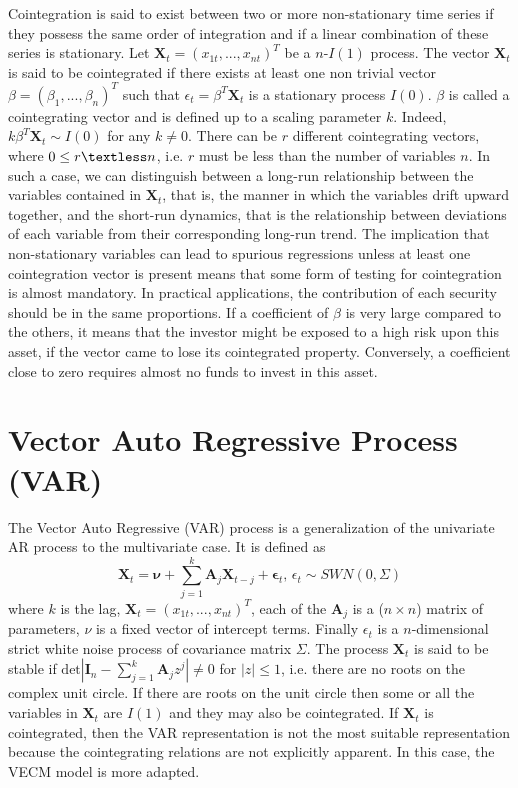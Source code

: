 \documentclass[11pt,a4,twosided,singlespacing,titlepagenumber=on]{scrreprt}
\numberwithin{equation}{chapter} %
\theoremstyle{remark}
\newcommand{\matr}[1]{\mathbf{#1}}
\begin{document}
Cointegration is said to exist between two or more non-stationary time series if they possess the same order of integration and if a linear combination of these series is stationary. Let $\matr{X}_t = (x_{1t},...,x_{nt})^T$ be a $n$-$I(1)$ process. The vector $\matr{X}_t$ is said to be cointegrated if there exists at least one non trivial vector $\beta = (\beta_1,...,\beta_n)^T$ such that $\epsilon_t = \beta^T \matr{X}_t$ is a stationary process $I(0)$. $\beta$ is called a cointegrating vector and is defined up to a scaling parameter $k$. Indeed, $k\beta^T\matr{X}_t \sim I(0)$ for any $k \neq 0$. There can be $r$ different cointegrating vectors, where $0 \leq r \textless n$, i.e. $r$ must be less than the number of variables $n$. In such a case, we can distinguish between a long-run relationship between the variables contained in $\matr{X}_t$, that is, the manner in which the variables drift upward together, and the short-run dynamics, that is the relationship between deviations of each variable from their corresponding long-run trend. The implication that non-stationary variables can lead to spurious regressions unless at least one cointegration vector is present means that some form of testing for cointegration is almost mandatory. In practical applications, the contribution of each security should be in the same proportions. If a coefficient of $\beta$ is very large compared to the others, it means that the investor might be exposed to a high risk upon this asset, if the vector came to lose its cointegrated property. Conversely, a coefficient close to zero requires almost no funds to invest in this asset.

\section{Vector Auto Regressive Process (VAR)}
The Vector Auto Regressive (VAR) process is a generalization of the univariate AR process to the multivariate case. It is defined as
\begin{equation}
\matr{X}_t = \matr{\nu} + \sum_{j=1}^k \matr{A}_j \matr{X}_{t-j} + \matr{\epsilon}_t \text{, } \epsilon_t \sim SWN(0, \Sigma)
\end{equation}
where $k$ is the lag, $\matr{X}_t = (x_{1t},...,x_{nt})^T$, each of the $\matr{A}_j$ is a ($n \times n$) matrix of parameters, $\nu$ is a fixed vector of intercept terms. Finally $\epsilon_t$ is a $n$-dimensional strict white noise process of covariance matrix $\Sigma$. The process $\matr{X}_t$ is said to be stable if $\text{det}|\matr{I}_n - \sum_{j=1}^k \matr{A}_j z^j| \neq 0$ for $|z|\leq1$, i.e. there are no roots on the complex unit circle. If there are roots on the unit circle then some or all the variables in $\matr{X}_t$ are $I(1)$ and they may also be cointegrated. If $\matr{X}_t$ is cointegrated, then the VAR representation is not the most suitable representation because the cointegrating relations are not explicitly apparent. In this case, the VECM model is more adapted.
\end{document}
